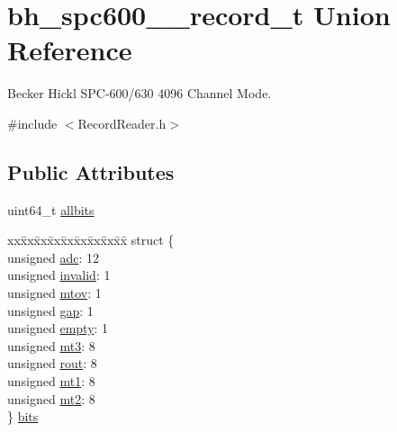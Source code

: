 \hypertarget{unionbh__spc600__4096__record__t}{}\section{bh\+\_\+spc600\+\_\+\_\+record\+\_\+t Union Reference}
\label{unionbh__spc600__4096__record__t}


Becker Hickl S\+P\+C-\/600/630 4096 Channel Mode.  




{\ttfamily \#include $<$Record\+Reader.\+h$>$}

\subsection*{Public Attributes}
\begin{DoxyCompactItemize}
\item 
uint64\+\_\+t \hyperlink{unionbh__spc600__4096__record__t_af84e62a389f6ad3392d353153ec4ec0e}{allbits}
\item 
\begin{tabbing}
xx\=xx\=xx\=xx\=xx\=xx\=xx\=xx\=xx\=\kill
struct \{\\
\>unsigned \hyperlink{unionbh__spc600__4096__record__t_a194b85d5b51f8e9d20b5b0689a0e08f9}{adc}: 12\\
\>unsigned \hyperlink{unionbh__spc600__4096__record__t_afb29d3c77452caa98e327da57085188c}{invalid}: 1\\
\>unsigned \hyperlink{unionbh__spc600__4096__record__t_a1c1d4ec75f3c9294e5416647de403ff0}{mtov}: 1\\
\>unsigned \hyperlink{unionbh__spc600__4096__record__t_ac952583be2fe0e818d8d5c56b5f9b23a}{gap}: 1\\
\>unsigned \hyperlink{unionbh__spc600__4096__record__t_af9e5f5277d7349038b5e1992d9e9f7bd}{empty}: 1\\
\>unsigned \hyperlink{unionbh__spc600__4096__record__t_a5d8a9e65eed7f9b60f4445d63fc2499e}{mt3}: 8\\
\>unsigned \hyperlink{unionbh__spc600__4096__record__t_a191959652c4efa92f40c3515e2b1953e}{rout}: 8\\
\>unsigned \hyperlink{unionbh__spc600__4096__record__t_a20d7c4974ef00336eb7b05b055a72e9c}{mt1}: 8\\
\>unsigned \hyperlink{unionbh__spc600__4096__record__t_ae5abb5b9ea7453d7a67e8e52ba6df927}{mt2}: 8\\
\} \hyperlink{unionbh__spc600__4096__record__t_ae04df6462dc1ca8817185c44b984c055}{bits}\\

\end{tabbing}\end{DoxyCompactItemize}


